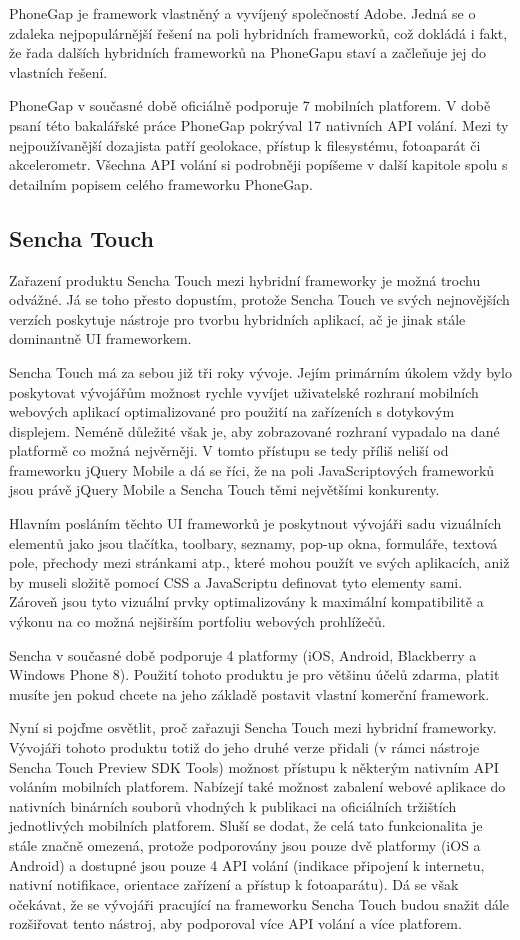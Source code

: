 PhoneGap je framework vlastněný a vyvíjený společností Adobe. Jedná se o zdaleka nejpopulárnější řešení na poli hybridních frameworků, což dokládá i fakt, že řada dalších hybridních frameworků na PhoneGapu staví a začleňuje jej do vlastních řešení.

PhoneGap v současné době oficiálně podporuje 7 mobilních platforem. V době psaní této bakalářské práce PhoneGap pokrýval 17 nativních API volání. Mezi ty nejpoužívanější dozajista patří geolokace, přístup k filesystému, fotoaparát či akcelerometr. Všechna API volání si podrobněji popíšeme v další kapitole spolu s detailním popisem celého frameworku PhoneGap.

\subsection{Sencha Touch}
Zařazení produktu Sencha Touch mezi hybridní frameworky je možná trochu odvážné. Já se toho přesto dopustím, protože Sencha Touch ve svých nejnovějších verzích poskytuje nástroje pro tvorbu hybridních aplikací, ač je jinak stále dominantně UI frameworkem.

Sencha Touch má za sebou již tři roky vývoje. Jejím primárním úkolem vždy bylo poskytovat vývojářům možnost rychle vyvíjet uživatelské rozhraní mobilních webových aplikací optimalizované pro použití na zařízeních s dotykovým displejem. Neméně důležité však je, aby zobrazované rozhraní vypadalo na dané platformě co možná nejvěrněji. V tomto přístupu se tedy příliš neliší od frameworku jQuery Mobile a dá se říci, že na poli JavaScriptových frameworků jsou právě jQuery Mobile a Sencha Touch těmi největšími konkurenty.

Hlavním posláním těchto UI frameworků je poskytnout vývojáři sadu vizuálních elementů jako jsou tlačítka, toolbary, seznamy, pop-up okna, formuláře, textová pole, přechody mezi stránkami atp., které mohou použít ve svých aplikacích, aniž by museli složitě pomocí CSS a JavaScriptu definovat tyto elementy sami. Zároveň jsou tyto vizuální prvky optimalizovány k maximální kompatibilitě a výkonu na co možná nejširším portfoliu webových prohlížečů.

Sencha v současné době podporuje 4 platformy (iOS, Android, Blackberry a Windows Phone 8). Použití tohoto produktu je pro většinu účelů zdarma, platit musíte jen pokud chcete na jeho základě postavit vlastní komerční framework.

Nyní si pojďme osvětlit, proč zařazuji Sencha Touch mezi hybridní frameworky. Vývojáři tohoto produktu totiž do jeho druhé verze přidali (v rámci nástroje Sencha Touch Preview SDK Tools) možnost přístupu k některým nativním API voláním mobilních platforem. Nabízejí také možnost zabalení webové aplikace do nativních binárních souborů vhodných k publikaci na oficiálních tržištích jednotlivých mobilních platforem. Sluší se dodat, že celá tato funkcionalita je stále značně omezená, protože podporovány jsou pouze dvě platformy (iOS a Android) a dostupné jsou pouze 4 API volání (indikace připojení k internetu, nativní notifikace, orientace zařízení a přístup k fotoaparátu). Dá se však očekávat, že se vývojáři pracující na frameworku Sencha Touch budou snažit dále rozšiřovat tento nástroj, aby podporoval více API volání a více platforem.

